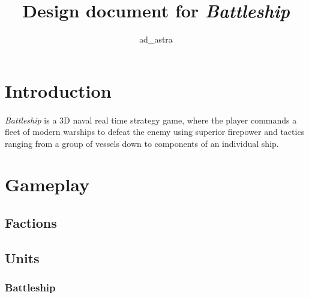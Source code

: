 \documentclass{article}[10pt]
\begin{document}
\title{Design document for \emph{Battleship}}
\author{ad\_astra}
\maketitle

\pagebreak
\tableofcontents
\pagebreak

\section{Introduction}
\paragraph{}
\emph{Battleship} is a 3D naval real time strategy game, where the player commands a fleet of modern warships to defeat the enemy using superior firepower and tactics ranging from a group of vessels down to components of an individual ship.
\pagebreak



\section{Gameplay}
\subsection{Factions}
\paragraph{}

\subsection{Units}
\subsubsection{Battleship}
\paragraph{}
\end{document}
